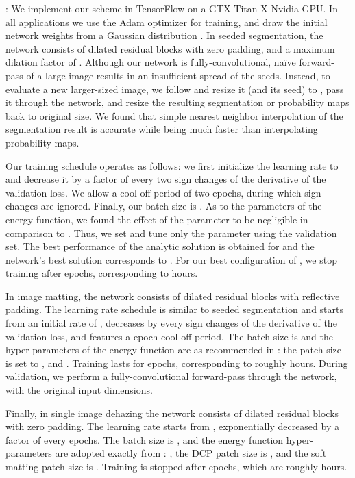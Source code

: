 \documentclass[journal]{IEEEtran}
\begin{document}
: We implement our scheme in TensorFlow on a GTX Titan-X Nvidia GPU. In all applications we use the Adam \cite{Adam} optimizer for training, and draw the initial network weights from a Gaussian distribution . 
In seeded segmentation, the network consists of  dilated residual blocks with zero padding, and a maximum dilation factor of . Although our network is fully-convolutional, na\"ive forward-pass of a large image results in an insufficient spread of the seeds. Instead, to evaluate a new larger-sized image, we follow \cite{normalized_cut_energy} and resize it (and its seed) to , pass it through the network, and resize the resulting segmentation or probability maps back to original size. We found that simple nearest neighbor interpolation of the segmentation result is accurate while being much faster than interpolating  probability maps. 

Our training schedule operates as follows: we first initialize the learning rate to  and decrease it by a factor of  every two sign changes of the derivative of the validation loss. We allow a cool-off period of two epochs, during which sign changes are ignored. Finally, our batch size is . As to the parameters of the energy function, we found the effect of the parameter  to be negligible in comparison to . Thus, we set  and tune only the  parameter using the validation set. The best performance of the analytic solution is obtained for  and the network's best solution corresponds to . For our best configuration of , we stop training after  epochs, corresponding to  hours.

In image matting, the network consists of  dilated residual blocks with reflective padding. The learning rate schedule is similar to seeded segmentation and starts from an initial rate of , decreases by  every  sign changes of the derivative of the validation loss, and features a  epoch cool-off period. The batch size is  and the hyper-parameters of the energy function are as recommended in \cite{closed_form_matting}: the patch size is set to , and . Training lasts for  epochs, corresponding to roughly  hours. During validation, we perform a fully-convolutional forward-pass through the network, with the original input dimensions.

Finally, in single image dehazing the network consists of  dilated residual blocks with zero padding. The learning rate starts from , exponentially decreased by a factor of  every  epochs. The batch size is , and the energy function hyper-parameters are adopted exactly from \cite{energy_dehazing}: , the DCP patch size is , and the soft matting patch size is . Training is stopped after  epochs, which are roughly  hours.
\end{document}
